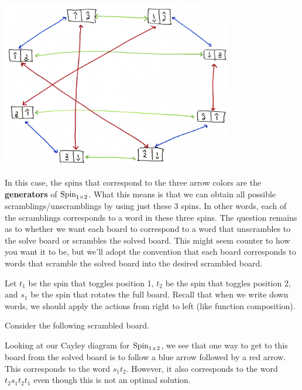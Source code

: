 \begin{center}
\includegraphics[width=4in]{cayley_spin1by2.png}
\end{center}

\noindent In this case, the spins that correspond to the three arrow colors are the \textbf{generators} of $\operatorname{Spin}_{1\times 2}$.  What this means is that we can obtain all possible scramblings/unscramblings by using just these 3 spins.  In other words, each of the scramblings corresponds to a word in these three spins.  The question remains as to whether we want each board to correspond to a word that unscrambles to the solve board or scrambles the solved board.  This might seem counter to how you want it to be, but we'll adopt the convention that each board corresponds to words that scramble the solved board into the desired scrambled board.

Let $t_1$ be the spin that toggles position 1, $t_2$ be the spin that toggles position 2, and $s_1$ be the spin that rotates the full board.  Recall that when we write down words, we should apply the actions from right to left (like function composition).  

Consider the following scrambled board.

\begin{center}
\end{center}

\noindent Looking at our Cayley diagram for $\operatorname{Spin}_{1\times 2}$, we see that one way to get to this board from the solved board is to follow a blue arrow followed by a red arrow.  This corresponds to the word $s_1t_2$.  However, it also corresponds to the word $t_2s_1t_2t_1$ even though this is not an optimal solution.


